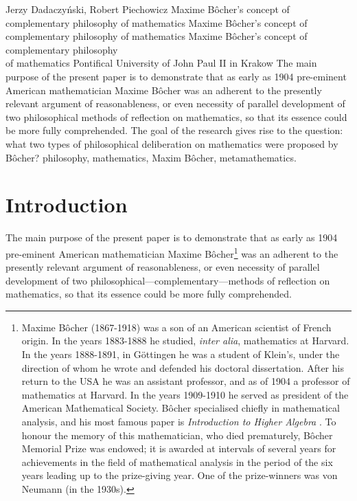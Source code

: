 \begin{artengenv}{Jerzy Dadaczyński, Robert Piechowicz}
	{Maxime Bôcher's concept of complementary philosophy of mathematics}
	{Maxime Bôcher's concept of complementary philosophy of mathematics}
	{Maxime Bôcher's concept of complementary philosophy\\of mathematics}
	{Pontifical University of John Paul II in Krakow}
	{The main purpose of the present paper is to demonstrate that as early as 1904 pre-eminent American mathematician Maxime Bôcher was an adherent to the presently relevant argument of reasonableness, or even necessity of parallel development of two philosophical methods of reflection on mathematics, so that its essence could be more fully comprehended. The goal of the research gives rise to the question: what two types of philosophical deliberation on mathematics were proposed by Bôcher?}
	{philosophy, mathematics, Maxim Bôcher, metamathematics.}
	




\section{Introduction}
\lettrine[loversize=0.13,lines=2,lraise=-0.05,nindent=0em,findent=0.2pt]%
{T}{}he main purpose of the present paper is to demonstrate that as early as 1904 pre-eminent American mathematician Maxime Bôcher\footnote{Maxime Bôcher (1867-1918) was a son of an American scientist of French origin. In the years 1883-1888 he studied, \textit{inter alia}, mathematics at Harvard. In the years 1888-1891, in Göttingen he was a student of Klein's, under the direction of whom he wrote and defended his doctoral dissertation. After his return to the USA he was an assistant professor, and as of 1904 a professor of mathematics at Harvard. In the years 1909-1910 he served as president of the American Mathematical Society. Bôcher specialised chiefly in mathematical analysis, and his most famous paper is \textit{Introduction to Higher Algebra}
\parencite[][]{bocher_introduction_1907}.
To honour the memory of this mathematician, who died prematurely, Bôcher Memorial Prize was endowed; it is awarded at intervals of several years for achievements in the field of mathematical analysis in the period of the six years leading up to the prize-giving year. One of the prize-winners was von Neumann (in the 1930s).} was an adherent to the presently relevant argument of reasonableness, or even necessity of parallel development of two philosophical---complementary---methods of reflection on mathematics, so that its essence could be more fully comprehended.


\end{artengenv}
